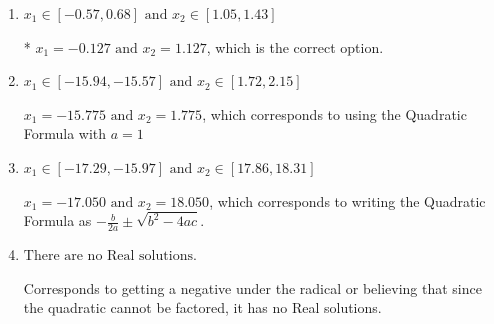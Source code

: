 \documentclass{extbook}[14pt]
\begin{document}
\begin{enumerate}
{\begin{enumerate}[label=\Alph*.]
 $x_1 = -1.127 \text{ and } x_2 = 0.127$, which corresponds to writing the Quadratic Formula as $\frac{b \pm \sqrt{b^2 - 4ac}}{2a}$
\item \( x_1 \in [-0.57, 0.68] \text{ and } x_2 \in [1.05, 1.43] \)

* $x_1 = -0.127 \text{ and } x_2 = 1.127$, which is the correct option.
\item \( x_1 \in [-15.94, -15.57] \text{ and } x_2 \in [1.72, 2.15] \)

 $x_1 = -15.775 \text{ and } x_2 = 1.775$, which corresponds to using the Quadratic Formula with $a=1$
\item \( x_1 \in [-17.29, -15.97] \text{ and } x_2 \in [17.86, 18.31] \)

 $x_1 = -17.050 \text{ and } x_2 = 18.050$, which corresponds to writing the Quadratic Formula as $-\frac{b}{2a} \pm \sqrt{b^2 - 4ac}$.
\item \( \text{There are no Real solutions.} \)

Corresponds to getting a negative under the radical or believing that since the quadratic cannot be factored, it has no Real solutions.
\end{enumerate}

}
\end{enumerate}
\end{document}
